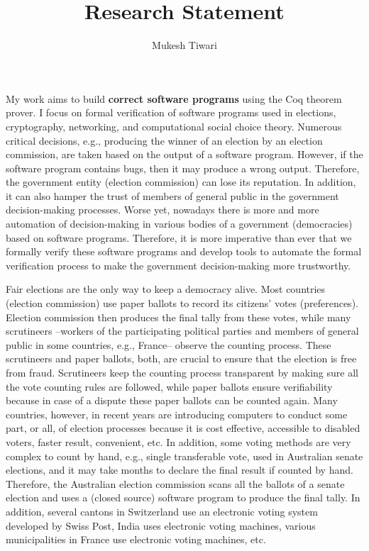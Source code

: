 \documentclass[a4paper]{article}
\title{Research Statement}
\author{Mukesh Tiwari}
\date{}
\begin{document}
\fontsize{12}{15}
\selectfont
\maketitle

My work aims to build \textbf{correct software programs} 
using the Coq theorem prover. 
I focus on formal verification of software programs used in elections, cryptography, 
networking, and computational social choice theory. Numerous critical decisions, e.g., 
producing the winner of an election by an election commission,
are taken based on the output of a software program. However, if the
software program contains bugs, then it may produce a wrong 
output. Therefore, the government entity (election commission) can 
lose its reputation. In addition, it can also hamper the trust of  
members of general public in the government decision-making processes.
Worse yet, nowadays there is more and more automation of decision-making 
in various bodies of a government (democracies) based on software programs.
Therefore, it is more imperative than ever  that  we formally verify these software programs and 
develop tools to automate the formal verification process to make the 
government decision-making more trustworthy. 

Fair elections are the only way to keep a democracy alive. Most countries (election commission) use paper ballots to record 
its citizens' votes (preferences). Election commission then produces the final tally from these votes, 
while many scrutineers --workers of the participating political parties and members of general 
public in some countries, e.g., France-- observe the counting process. 
These scrutineers and paper ballots, both, are crucial to ensure that 
the election is free from fraud. Scrutineers keep the counting process transparent by making sure all the vote counting 
rules are followed, while paper ballots ensure verifiability because in case of a dispute these paper ballots 
can be counted again. Many countries, however, in recent years are introducing computers to conduct some part, or all, of 
election processes because it is cost effective, accessible to disabled voters, faster result, convenient, etc. 
In addition, some voting methods are very complex to count by hand, e.g., 
single transferable vote, used in Australian senate elections, and it may take months to declare the final result if 
counted by hand. Therefore, the Australian election commission scans all the ballots of a senate election and 
uses a (closed source) software program to produce the final tally. In addition, several cantons in Switzerland use an electronic 
voting system developed by Swiss Post, India uses electronic voting machines, various municipalities in France 
use electronic voting machines, etc.
\end{document}

